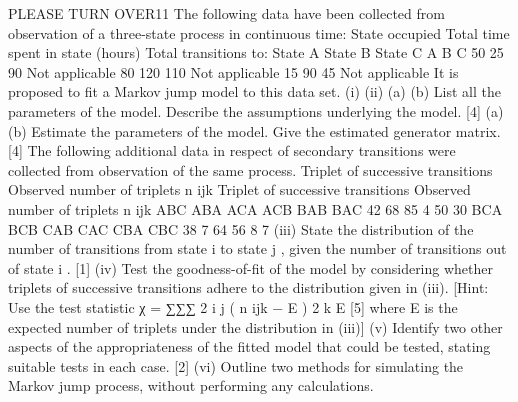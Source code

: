 \documentclass[a4paper,12pt]{article}
\begin{document}
\begin{enumerate}
PLEASE TURN OVER11
The following data have been collected from observation of a three-state process in
continuous time:
State
occupied Total time
spent in state
(hours)
Total transitions to:
State A State B State C
A
B
C 50
25
90 Not applicable
80
120 110
Not applicable
15 90
45
Not applicable
It is proposed to fit a Markov jump model to this data set.
(i)
(ii)
(a)
(b) List all the parameters of the model.
Describe the assumptions underlying the model. [4]
(a)
(b) Estimate the parameters of the model.
Give the estimated generator matrix. [4]
The following additional data in respect of secondary transitions were collected from
observation of the same process.
Triplet of
successive
transitions Observed
number of
triplets
n ijk Triplet of
successive
transitions Observed
number of
triplets
n ijk
ABC
ABA
ACA
ACB
BAB
BAC 42
68
85
4
50
30 BCA
BCB
CAB
CAC
CBA
CBC 38
7
64
56
8
7
(iii) State the distribution of the number of transitions from state i to state j , given
the number of transitions out of state i .
[1]
(iv) Test the goodness-of-fit of the model by considering whether triplets of
successive transitions adhere to the distribution given in (iii).
[Hint: Use the test statistic χ = ∑∑∑
2
i
j
( n ijk − E ) 2
k
E
[5]
where E is the expected
number of triplets under the distribution in (iii)]
(v) Identify two other aspects of the appropriateness of the fitted model that could
be tested, stating suitable tests in each case.
[2]
(vi) Outline two methods for simulating the Markov jump process, without
performing any calculations.












\end{enumerate}
\end{document}
